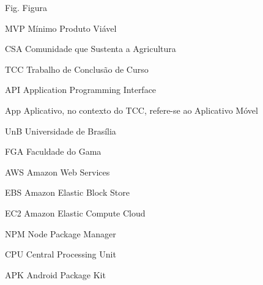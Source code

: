\begin{siglas}
  \item[Fig.] Figura
  \item[MVP] Mínimo Produto Viável
  \item[CSA] Comunidade que Sustenta a Agricultura
  \item[TCC] Trabalho de Conclusão de Curso
  \item[API] Application Programming Interface
  \item[App] Aplicativo, no contexto do TCC, refere-se ao Aplicativo Móvel
  \item[UnB] Universidade de Brasília
  \item[FGA] Faculdade do Gama
  \item[AWS] Amazon Web Services
  \item[EBS] Amazon Elastic Block Store
  \item[EC2] Amazon Elastic Compute Cloud
  \item[NPM] Node Package Manager
  \item[CPU] Central Processing Unit
  \item[APK] Android Package Kit
\end{siglas}

